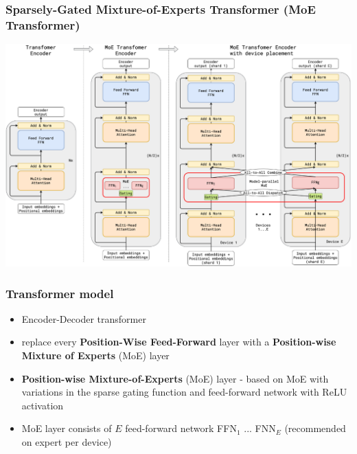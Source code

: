 \documentclass{beamer}
\begin{document}
\begin{frame}
    \frametitle{Sparsely-Gated Mixture-of-Experts Transformer (MoE Transformer)}
    \begin{center}
        \includegraphics[scale=0.25]{img/gshard_architecture.png}
    \end{center}
\end{frame}

\begin{frame}
    \frametitle{Transformer model}
    \begin{itemize}
        \item Encoder-Decoder transformer
        \item replace every \textbf{Position-Wise Feed-Forward} layer with a \textbf{Position-wise Mixture of Experts} (MoE) layer
        \item \textbf{Position-wise Mixture-of-Experts} (MoE) layer - based on MoE \cite{moe_layer} with variations in the sparse gating function and feed-forward network with ReLU activation
        \item MoE layer consists of $E$ feed-forward network FFN$_{1}$ ... FNN$_{E}$ (recommended on expert per device)
    \end{itemize}
\end{frame}
\end{document}
